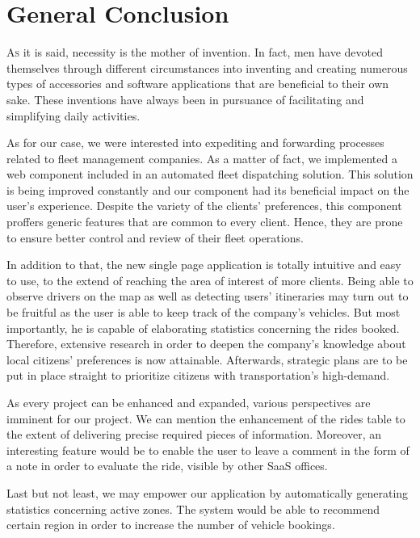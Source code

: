 \chapter*{General Conclusion}


\lettrine{A}s it is said, necessity is the mother of invention. In fact, men have devoted themselves through different circumstances into inventing and creating numerous types of accessories and software applications that are beneficial to their own sake. These inventions have always been in pursuance of facilitating and simplifying daily activities.

As for our case, we were interested into expediting and forwarding processes related to fleet management companies. As a matter of fact, we implemented a web component included in an automated fleet dispatching solution. This solution is being improved constantly and our component had its beneficial impact on the user's experience. 
Despite the variety of the clients' preferences, this component proffers generic features that are common to every client. Hence, they are prone to ensure better control and review of their fleet operations.


In addition to that, the new single page application is totally intuitive and easy to use, to the extend of reaching the area of interest of more clients. Being able to observe drivers on the map as well as detecting users' itineraries may turn out to be fruitful as the user is able to keep track of the company's vehicles. But most importantly, he is capable of elaborating statistics concerning the rides booked. Therefore, extensive research in order to deepen the company's knowledge about local citizens' preferences is now attainable. Afterwards, strategic plans are to be put in place straight to prioritize citizens with transportation's high-demand.


As every project can be enhanced and expanded, various perspectives are imminent for our project. We can mention the enhancement of the rides table to the extent of delivering precise required pieces of information.
Moreover, an interesting feature would be to enable the user to leave a comment in the form of a note in order to evaluate the ride, visible by other SaaS offices. 


Last but not least, we may empower our application by automatically generating statistics concerning active zones. The system would be able to recommend certain region in order to increase the number of vehicle bookings.